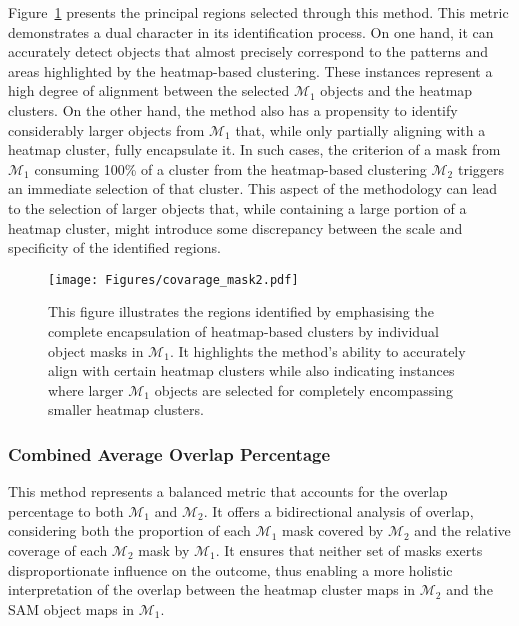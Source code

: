 Figure~\ref{Fig:covarage_mask2} presents the principal regions selected through this method. This metric demonstrates a dual character in its identification process. On one hand, it can accurately detect objects that almost precisely correspond to the patterns and areas highlighted by the heatmap-based clustering. These instances represent a high degree of alignment between the selected \(\mathcal{M}_1\) objects and the heatmap clusters. On the other hand, the method also has a propensity to identify considerably larger objects from \(\mathcal{M}_1\) that, while only partially aligning with a heatmap cluster, fully encapsulate it. In such cases, the criterion of a mask from \(\mathcal{M}_1\) consuming 100\% of a cluster from the heatmap-based clustering \(\mathcal{M}_2\) triggers an immediate selection of that cluster. This aspect of the methodology can lead to the selection of larger objects that, while containing a large portion of a heatmap cluster, might introduce some discrepancy between the scale and specificity of the identified regions.

\begin{figure}[ht!]
\begin{center}
\texttt{[image: Figures/covarage\_mask2.pdf]}
\end{center}
\caption{This figure illustrates the regions identified by emphasising the complete encapsulation of heatmap-based clusters by individual object masks in $\mathcal{M}_1$. It highlights the method's ability to accurately align with certain heatmap clusters while also indicating instances where larger $\mathcal{M}_1$ objects are selected for completely encompassing smaller heatmap clusters.}
\label{Fig:covarage_mask2}
\end{figure} 

\subsubsection{Combined Average Overlap Percentage}

This method represents a balanced metric that accounts for the overlap percentage to both \(\mathcal{M}_1\) and \(\mathcal{M}_2\). It offers a bidirectional analysis of overlap, considering both the proportion of each \(\mathcal{M}_1\) mask covered by \(\mathcal{M}_2\) and the relative coverage of each \(\mathcal{M}_2\) mask by \(\mathcal{M}_1\). It ensures that neither set of masks exerts disproportionate influence on the outcome, thus enabling a more holistic interpretation of the overlap between the heatmap cluster maps in \(\mathcal{M}_2\) and the SAM object maps in $\mathcal{M}_1$. 


